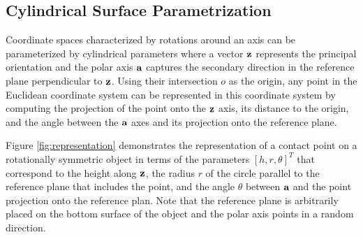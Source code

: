 \documentclass{aamas2015}
\begin{document}
\subsection{Cylindrical Surface Parametrization}

Coordinate spaces characterized by rotations around an axis can be parameterized by cylindrical
parameters where a vector $\textbf{z}$ represents the principal orientation and the polar axis
$\textbf{a}$ captures the secondary direction in the reference plane perpendicular to $\textbf{z}$. 
Using their intersection $o$ as the origin, any point in the Euclidean coordinate system can
be represented in this coordinate system by computing the projection of the point onto the
$\textbf{z}$ axis, its distance to the origin, and the angle between the $\textbf{a}$ axes and its
projection onto the reference plane. 

Figure \ref{fig:representation} demonstrates the representation
of a contact point on a rotationally symmetric object in terms of the parameters $[h, r, \theta]^T$
that correspond to the height along $\textbf{z}$, the radius $r$ of the circle parallel to the
reference plane that includes the point, and the angle $\theta$ between $\textbf{a}$ and the point
projection onto the reference plan. Note that the reference plane is arbitrarily placed 
on the bottom surface of the object and the polar axis points in a random
direction. 
\end{document}
